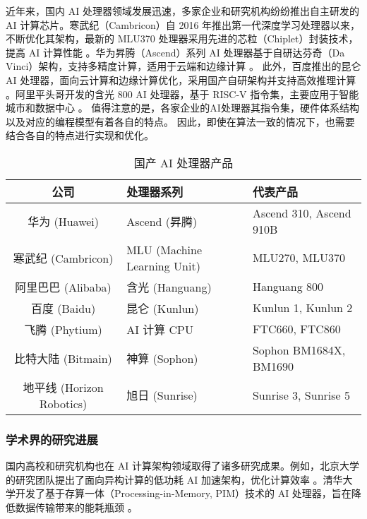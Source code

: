 近年来，国内 AI 处理器领域发展迅速，多家企业和研究机构纷纷推出自主研发的 AI 计算芯片。寒武纪（Cambricon）自 2016 年推出第一代深度学习处理器以来，不断优化其架构，最新的 MLU370 处理器采用先进的芯粒（Chiplet）封装技术，提高 AI 计算性能 \cite{cambricon2022mlu}。华为昇腾（Ascend）系列 AI 处理器基于自研达芬奇（Da Vinci）架构，支持多精度计算，适用于云端和边缘计算 \cite{huawei2021ascend}。
此外，百度推出的昆仑 AI 处理器，面向云计算和边缘计算优化，采用国产自研架构并支持高效推理计算 \cite{baidu2021kunlun}。阿里平头哥开发的含光 800 AI 处理器，基于 RISC-V 指令集，主要应用于智能城市和数据中心 \cite{alibaba2019hanguang}。
值得注意的是，各家企业的AI处理器其指令集，硬件体系结构以及对应的编程模型有着各自的特点。
因此，即使在算法一致的情况下，也需要结合各自的特点进行实现和优化。

\begin{table}
    \centering
    \caption{国产 AI 处理器产品}
    \label{tab:ai_chips_1}
    \begin{tabular}{cll} %
      \toprule
      公司   & 处理器系列                                       & 代表产品                          \\
      \midrule
      {华为 (Huawei)} & Ascend (昇腾) & Ascend 310, Ascend 910B \\ 
      {寒武纪 (Cambricon)} & MLU (Machine Learning Unit) & MLU270, MLU370 \\ 
      {阿里巴巴 (Alibaba)} & 含光 (Hanguang) & Hanguang 800 \\ 
      {百度 (Baidu)} & 昆仑 (Kunlun) & Kunlun 1, Kunlun 2 \\ 
      {飞腾 (Phytium)} & AI 计算 CPU & FTC660, FTC860 \\ 
      {比特大陆 (Bitmain)} & 神算 (Sophon) & Sophon BM1684X, BM1690 \\ 
      {地平线 (Horizon Robotics)} & 旭日 (Sunrise) & Sunrise 3, Sunrise 5 \\ 
 
      \bottomrule
    \end{tabular}
\end{table}

\subsubsection{学术界的研究进展}

国内高校和研究机构也在 AI 计算架构领域取得了诸多研究成果。例如，北京大学的研究团队提出了面向异构计算的低功耗 AI 加速架构，优化计算效率 \cite{li2022pku}。清华大学开发了基于存算一体（Processing-in-Memory, PIM）技术的 AI 处理器，旨在降低数据传输带来的能耗瓶颈 \cite{zhang2023pim}。

